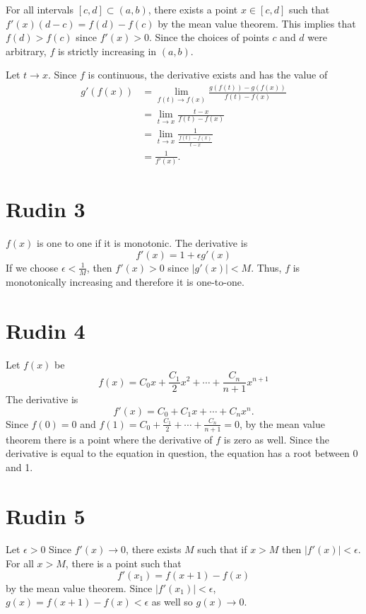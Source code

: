 \documentclass{article}
\begin{document}
For all intervals $[c, d] \subset (a,b)$, there exists a point 
$x \in [c,d]$ such that $f'(x)(d-c) = f(d) - f(c)$ by the mean value theorem.
This implies that $f(d) > f(c)$ since $f'(x) > 0$.
Since the choices of points $c$ and $d$ were arbitrary, 
$f$ is strictly increasing in $(a,b)$.


Let $t \to x$. Since $f$ is continuous, the derivative exists and has the value of
\begin{align*}
	g'(f(x)) &= \lim_{f(t) \to f(x)} \frac{g(f(t))-g(f(x))}{f(t) - f(x)} \\
	&= \lim_{t \to x} \frac{t-x}{f(t)-f(x)} \\
	&= \lim_{t \to x} \frac{1}{\frac{f(t)-f(x)}{t-x}} \\
	&= \frac{1}{f'(x)}.
\end{align*}
\newpage 

\section*{Rudin 3}
$f(x)$ is one to one if it is monotonic.
The derivative is 
\[
	f'(x) = 1 + \epsilon g'(x)
\]
If we choose $\epsilon < \frac{1}{M}$,
then $f'(x) > 0$ since $|g'(x)| < M$.
Thus, $f$ is monotonically increasing and therefore it is one-to-one.
\newpage 

\section*{Rudin 4}
Let $f(x)$ be
\[
	f(x) = C_0x + \frac{C_1}{2}x^2 +  \cdots + \frac{C_n}{n+1}x^{n+1}
\]
The derivative is 
\[
	f'(x) = C_0 + C_1x +  \cdots + C_nx^{n}.
\]
Since $f(0) = 0$ and $f(1) = C_0 + \frac{C_1}{2} +  \cdots + \frac{C_n}{n+1} = 0$,
by the mean value theorem there is a point where the derivative of $f$ is zero as well.
Since the derivative is equal to the equation in question,
the equation has a root between 0 and 1.
\newpage 

\section*{Rudin 5}
Let $\epsilon > 0$
Since $f'(x) \to 0$, there exists $M$ 
such that if $x > M$ then $|f'(x)| < \epsilon$.
For all $x > M$, there is a point such that 
\[
	f'(x_1) = f(x+1) - f(x)
\]
by the mean value theorem.
Since $|f'(x_1)| < \epsilon$, $g(x) = f(x+1) - f(x) < \epsilon$ as well so $g(x) \to 0$.
\newpage 
\end{document}
